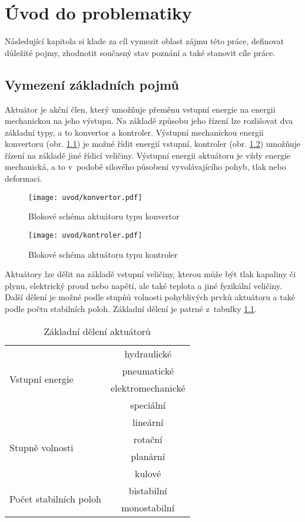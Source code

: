\chapter{Úvod do problematiky}
Následující kapitola si klade za cíl vymezit oblast zájmu této práce, definovat důležité pojmy, zhodnotit současný stav poznání a také stanovit cíle práce.

\section{Vymezení základních pojmů}
Aktuátor je akční člen, který umožňuje přeměnu vstupní energie na energii mechanickou na jeho výstupu. Na základě způsobu jeho řízení lze rozlišovat dva základní typy, a to konvertor a kontroler. Výstupní mechanickou energii konvertoru (obr. \ref{obr:konvertor}) je možné řídit energií vstupní, kontroler (obr. \ref{obr:kontroler}) umožňuje řízení na základě jiné řídicí veličiny. Výstupní energii aktuátoru je vždy energie mechanická, a to v~podobě silového působení vyvolávajícího pohyb, tlak nebo deformaci. \cite{janocha2010actuators} \cite{ulrych2009aktuatory} \cite{mach2010aktuatory}

\begin{figure}[h!]
  \centering
  \texttt{[image: uvod/konvertor.pdf]}
  \caption{Blokové schéma aktuátoru typu konvertor}
  \label{obr:konvertor}
\end{figure}

\begin{figure}[h!]
  \centering
  \texttt{[image: uvod/kontroler.pdf]}
  \caption{Blokové schéma aktuátoru typu kontroler}
  \label{obr:kontroler}
\end{figure}

Aktuátory lze dělit na základě vstupní veličiny, kterou může být tlak kapaliny či plynu, elektrický proud nebo napětí, ale také teplota a jiné fyzikální veličiny. Další dělení je možné podle stupňů volnosti pohyblivých prvků aktuátoru a také podle počtu stabilních poloh. Základní dělení je patrné z~tabulky \ref{tab:deleni_aktuatoru}. \cite{brauer2006magnetic}

\begin{table}[h!]
\caption{Základní dělení aktuátorů}
\begin{center}
\begin{tabular}{|l|c|}
  \hline
  \multirow{4}{*}{Vstupní energie} & hydraulické \\
  & pneumatické \\
  & elektromechanické \\
  & speciální \\
  \hline
  \multirow{4}{*}{Stupně volnosti} & lineární \\
  & rotační \\
  & planární \\
  & kulové \\
  \hline
  \multirow{2}{*}{Počet stabilních poloh} & bistabilní \\
  & monostabilní \\
  \hline
\end{tabular}
\end{center}
\label{tab:deleni_aktuatoru}
\end{table}

